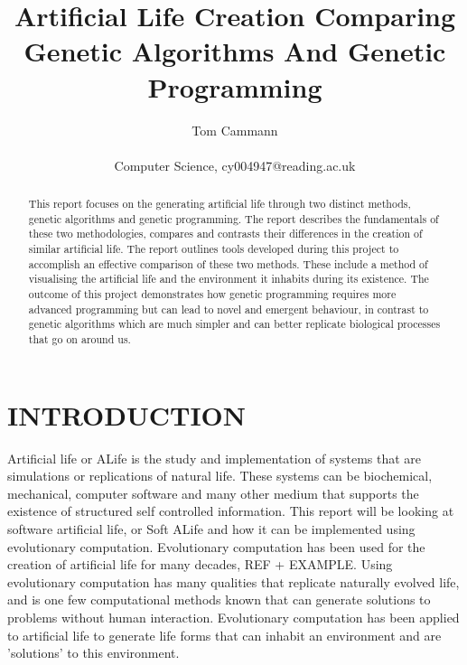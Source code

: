 \documentclass[10pt,twocolumn]{article}
\begin{document}
\title{Artificial Life Creation Comparing Genetic Algorithms And Genetic Programming}
\author{Tom Cammann\\\\
Computer Science, cy004947@reading.ac.uk}
\date{}
\maketitle
\begin{abstract}
This report focuses on the generating artificial life through two distinct methods, genetic algorithms and genetic programming. The report describes the fundamentals of these two methodologies, compares and contrasts their differences in the creation of similar artificial life. The report outlines tools developed during this project to accomplish an effective comparison of these two methods. These include a method of visualising the artificial life and the environment it inhabits during its existence. The outcome of this project demonstrates how genetic programming requires more advanced programming but can lead to novel and emergent behaviour, in contrast to genetic algorithms which are much simpler and can better replicate biological processes that go on around us. 
\end{abstract}


\section{INTRODUCTION}

Artificial life or ALife is the study and implementation of systems that are simulations or replications of natural life.
These systems can be biochemical, mechanical, computer software and many other medium that supports the existence of structured self controlled information.
This report will be looking at software artificial life, or Soft ALife and how it can be implemented using evolutionary computation.
Evolutionary computation has been used for the creation of artificial life for many decades, REF + EXAMPLE.
Using evolutionary computation has many qualities that replicate naturally evolved life, and is one few computational methods known that can generate solutions to problems without human interaction.
Evolutionary computation has been applied to artificial life to generate life forms that can inhabit an environment and are 'solutions' to this environment.
\end{document}

